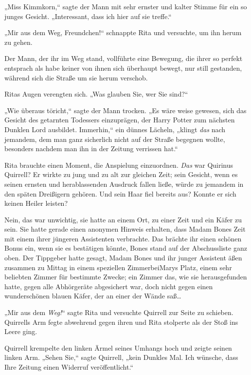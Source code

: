 {„Miss Kimmkorn,“ sagte der Mann mit sehr ernster und kalter Stimme für ein so junges Gesicht. „Interessant, dass ich hier auf sie treffe.“

„Mir aus dem Weg, Freundchen!“ schnappte Rita und versuchte, um ihn herum zu gehen.

Der Mann, der ihr im Weg stand, vollführte eine Bewegung, die ihrer so perfekt entsprach als habe keiner von ihnen sich überhaupt bewegt, nur still gestanden, während sich die Straße um sie herum verschob.

Ritas Augen verengten sich. „Was glauben Sie, wer Sie sind?“

„Wie überaus töricht,“ sagte der Mann trocken. „Es wäre weise gewesen, sich das Gesicht des getarnten Todessers einzuprägen, der Harry Potter zum nächsten Dunklen Lord ausbildet. Immerhin,“ ein dünnes Lächeln, „klingt \emph{das} nach jemandem, dem man ganz sicherlich nicht auf der Straße begegnen wollte, besonders nachdem man ihn in der Zeitung verrissen hat.“

Rita brauchte einen Moment, die Anspielung einzuordnen. \emph{Das} war Quirinus Quirrell? Er wirkte zu jung und zu alt zur gleichen Zeit; sein Gesicht, wenn es seinen ernsten und herablassenden Ausdruck fallen ließe, würde zu jemandem in den späten Dreißigern gehören. Und sein Haar fiel bereits aus? Konnte er sich keinen Heiler leisten?

Nein, das war unwichtig, sie hatte an einem Ort, zu einer Zeit und ein Käfer zu sein. Sie hatte gerade einen anonymen Hinweis erhalten, dass Madam Bones Zeit mit einem ihrer jüngeren Assistenten verbrachte. Das brächte ihr einen schönen Bonus ein, wenn sie es bestätigen könnte, Bones stand auf der Abschussliste ganz oben. Der Tippgeber hatte gesagt, Madam Bones und ihr junger Assistent äßen zusammen zu Mittag in einem speziellen ZimmerbeiMarys Platz, einem sehr beliebten Zimmer für bestimmte Zwecke; ein Zimmer das, wie sie herausgefunden hatte, gegen alle Abhörgeräte abgesichert war, doch nicht gegen einen wunderschönen blauen Käfer, der an einer der Wände saß…

„Mir aus dem \emph{Weg!}“ sagte Rita und versuchte Quirrell zur Seite zu schieben. Quirrells Arm fegte abwehrend gegen ihren und Rita stolperte als der Stoß ins Leere ging.

Quirrell krempelte den linken Ärmel seines Umhangs hoch und zeigte seinen linken Arm. „Sehen Sie,“ sagte Quirrell, „kein Dunkles Mal. Ich wünsche, dass Ihre Zeitung einen Widerruf veröffentlicht.“

}

